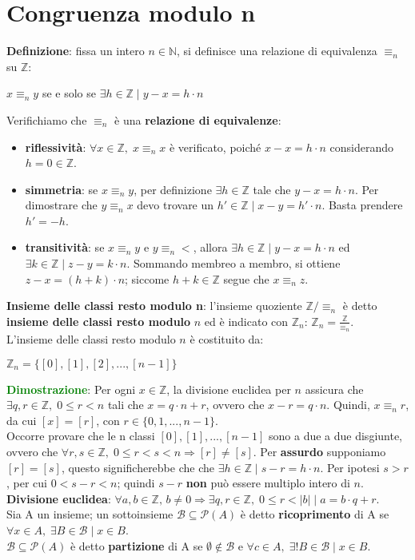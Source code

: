 \section{Congruenza modulo n}
\textbf{Definizione}: fissa un intero $n \in \mathbb{N}$, si definisce una relazione di equivalenza $\equiv_n$ su $\mathbb{Z}$:
\begin{center}
    $x \equiv_n y$ se e solo se $\exists h \in \mathbb{Z} \; | \; y - x = h \cdot n$
\end{center}
Verifichiamo che $\equiv_n$ è una \textbf{relazione di equivalenze}:
\begin{itemize}
    \item \textbf{riflessività}: $\forall x \in \mathbb{Z}, \; x \equiv_n x$ è verificato, poiché $x - x = h \cdot n$ considerando $h = 0 \in \mathbb{Z}$.
    \item \textbf{simmetria}: se $x \equiv_n y$, per definizione $\exists h \in \mathbb{Z}$ tale che $y - x = h \cdot n$. Per dimostrare che $y \equiv_n x$ devo trovare un $h' \in \mathbb{Z} \; | \; x-y = h' \cdot n$. Basta prendere $h'=-h$.
    \item \textbf{transitività}: se $x \equiv_n y$ e $y \equiv_n <$, allora $\exists h \in \mathbb{Z} \; | \; y - x = h \cdot n$ ed $\exists k \in \mathbb{Z} \; | \; z - y = k \cdot n$. Sommando membreo a membro, si ottiene $z - x = (h + k) \cdot n$; siccome $h + k \in \mathbb{Z}$ segue che $x \equiv_n z$.
\end{itemize}
\textbf{Insieme delle classi resto modulo n}: l'insieme quoziente $\mathbb{Z}/ \equiv_n$ è detto \textbf{insieme delle classi resto modulo} $n$ ed è indicato con $\mathbb{Z}_n$: $\mathbb{Z}_n = \frac{\mathbb{Z}}{\equiv_n}$. \\
L'insieme delle classi resto modulo $n$ è costituito da: 
\begin{center}
    $\mathbb{Z}_n = \{[0], [1], [2], ..., [n-1]\}$
\end{center}
\textcolor{green}{\textbf{Dimostrazione}}: Per ogni $x \in \mathbb{Z}$, la divisione euclidea per $n$ assicura che $\exists q,r \in \mathbb{Z}, \; 0 \leq r < n$ tali che $x = q \cdot n + r$, ovvero che $x - r = q \cdot n$. Quindi, $x \equiv_n r$, da cui $[x] = [r]$, con $r \in \{0,1,..., n-1\}$. \\
Occorre provare che le n classi $[0], [1], ..., [n-1]$ sono a due a due disgiunte, ovvero che $\forall r,s \in \mathbb{Z}, \; 0 \leq r < s < n \Rightarrow [r] \neq [s]$. Per \textbf{assurdo} supponiamo $[r] = [s]$, questo significherebbe che che $\exists h \in \mathbb{Z} \; | \; s - r = h \cdot n$. Per ipotesi $s > r$, per cui $0 < s - r < n$; quindi $s - r$ \textbf{non} può essere multiplo intero di $n$. \\
\textbf{Divisione euclidea}: $\forall a,b \in \mathbb{Z}, \, b \neq 0 \Rightarrow \exists q,r \in \mathbb{Z}, \; 0 \leq r < |b| \; | \; a = b \cdot q + r$. \\
Sia A un insieme; un sottoinsieme $\mathcal{B} \subseteq \mathcal{P}(A)$ è detto \textbf{ricoprimento} di A se $\forall x \in A, \; \exists B \in \mathcal{B} \; | \; x \in B$. \\
$\mathcal{B} \subseteq \mathcal{P}(A)$ è detto \textbf{partizione} di A se $\emptyset \notin \mathcal{B}$ e $\forall c \in A, \; \exists ! B \in \mathcal{B} \; | \; x \in B$.